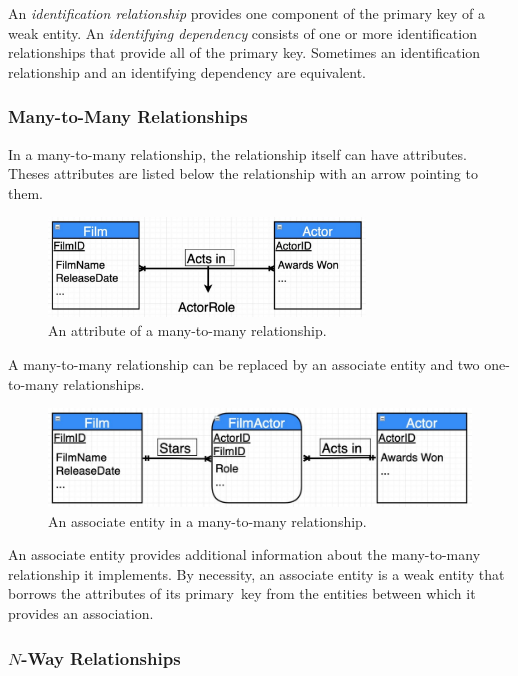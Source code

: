 An \emph{identification relationship} provides one component of the primary key of a weak entity.
An \emph{identifying dependency} consists of one or more identification relationships that provide all of the primary key.
Sometimes an identification relationship and an identifying dependency are equivalent.

\subsubsection{Many-to-Many Relationships}

In a many-to-many relationship, the relationship itself can have attributes.
Theses attributes are listed below the relationship with an arrow pointing to them.

\begin{figure}[htp]
  \centering
  \includegraphics[width=0.75\textwidth]{unit-1/figures/relationship-attribute.jpg}
  \caption*{An attribute of a many-to-many relationship.}
\end{figure}

A many-to-many relationship can be replaced by an associate entity and two one-to-many relationships.

\begin{figure}[htp]
  \centering
  \includegraphics[width=\textwidth]{unit-1/figures/associate-entity.jpg}
  \caption*{An associate entity in a many-to-many relationship.}
\end{figure}

An associate entity provides additional information about the many-to-many relationship it implements.
By necessity, an associate entity is a weak entity that borrows the attributes of its primary~key from the entities between which it provides an association.

\subsubsection{\( N \)-Way Relationships}

